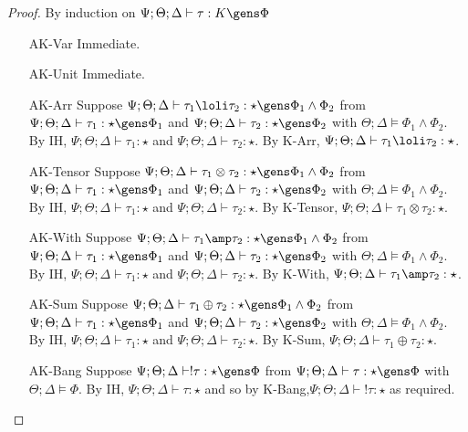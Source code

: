 \begin{proof}
By induction on $\Psi ; \Theta ; \Delta \vdash \tau : K \gens \Phi$
\begin{itemize}
  \item[AK-Var] Immediate.
  \item[AK-Unit] Immediate.
  \item[AK-Arr] Suppose $\Psi ; \Theta ; \Delta \vdash \tau_1 \loli \tau_2 : \star \gens \Phi_1 \wedge \Phi_2$ from $\Psi ; \Theta ; \Delta \vdash \tau_1 : \star \gens \Phi_1$ and  $\Psi ; \Theta ; \Delta \vdash \tau_2 : \star \gens \Phi_2$ with $\Theta ; \Delta \vDash \Phi_1 \wedge \Phi_2$. By IH, $\Psi ; \Theta ; \Delta \vdash \tau_1 : \star$ and $\Psi ; \Theta ; \Delta \vdash \tau_2 : \star$. By K-Arr, $\Psi ; \Theta ; \Delta \vdash \tau_1 \loli \tau_2 : \star$.
  \item[AK-Tensor]  Suppose $\Psi ; \Theta ; \Delta \vdash \tau_1 \otimes \tau_2 : \star \gens \Phi_1 \wedge \Phi_2$ from $\Psi ; \Theta ; \Delta \vdash \tau_1 : \star \gens \Phi_1$ and  $\Psi ; \Theta ; \Delta \vdash \tau_2 : \star \gens \Phi_2$ with $\Theta ; \Delta \vDash \Phi_1 \wedge \Phi_2$. By IH, $\Psi ; \Theta ; \Delta \vdash \tau_1 : \star$ and $\Psi ; \Theta ; \Delta \vdash \tau_2 : \star$. By K-Tensor, $\Psi ; \Theta ; \Delta \vdash \tau_1 \otimes \tau_2 : \star$.
  \item[AK-With] Suppose $\Psi ; \Theta ; \Delta \vdash \tau_1 \amp \tau_2 : \star \gens \Phi_1 \wedge \Phi_2$ from $\Psi ; \Theta ; \Delta \vdash \tau_1 : \star \gens \Phi_1$ and  $\Psi ; \Theta ; \Delta \vdash \tau_2 : \star \gens \Phi_2$ with $\Theta ; \Delta \vDash \Phi_1 \wedge \Phi_2$. By IH, $\Psi ; \Theta ; \Delta \vdash \tau_1 : \star$ and $\Psi ; \Theta ; \Delta \vdash \tau_2 : \star$. By K-With, $\Psi ; \Theta ; \Delta \vdash \tau_1 \amp \tau_2 : \star$.
  \item[AK-Sum] Suppose $\Psi ; \Theta ; \Delta \vdash \tau_1 \oplus \tau_2 : \star \gens \Phi_1 \wedge \Phi_2$ from $\Psi ; \Theta ; \Delta \vdash \tau_1 : \star \gens \Phi_1$ and  $\Psi ; \Theta ; \Delta \vdash \tau_2 : \star \gens \Phi_2$ with $\Theta ; \Delta \vDash \Phi_1 \wedge \Phi_2$. By IH, $\Psi ; \Theta ; \Delta \vdash \tau_1 : \star$ and $\Psi ; \Theta ; \Delta \vdash \tau_2 : \star$. By K-Sum, $\Psi ; \Theta ; \Delta \vdash \tau_1 \oplus \tau_2 : \star$.
  \item[AK-Bang] Suppose $\Psi ; \Theta ; \Delta \vdash !\tau : \star \gens \Phi$ from $\Psi ; \Theta ; \Delta \vdash \tau : \star \gens \Phi$ with $\Theta ; \Delta \vDash \Phi$. By IH, $\Psi ; \Theta ; \Delta \vdash \tau : \star$ and so by K-Bang,$\Psi ; \Theta ; \Delta \vdash !\tau : \star$ as required.

\end{itemize}
\end{proof}
